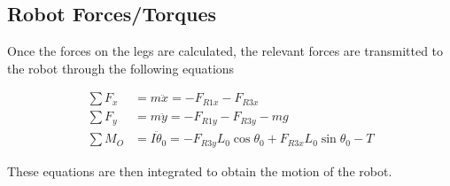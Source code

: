 \documentclass[letterpaper]{article}
\begin{document}
\subsection{Robot Forces/Torques}
Once the forces on the legs are calculated, the relevant forces are transmitted to the robot through the following equations

\begin{align}
	\sum F_x &= m \ddot{x} = -F_{R1x} - F_{R3x}  \\
	\sum F_y &= m \ddot{y} = -F_{R1y} - F_{R3y} - mg \\
	\sum M_O &= I \ddot{\theta}_0 = -F_{R3y} L_0 \cos \theta_0 + F_{R3x} L_0 \sin \theta_0 - T
\end{align}

\noindent These equations are then integrated to obtain the motion of the robot.

{}

\end{document}
